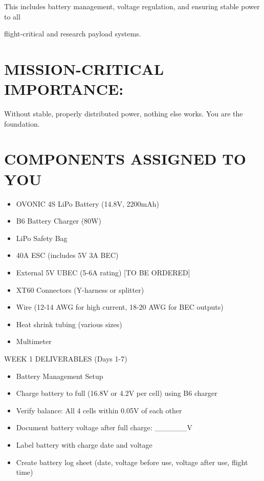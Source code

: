 \documentclass[11pt,letterpaper]{article}
\begin{document}
This includes battery management, voltage regulation, and ensuring stable power to all\par

flight-critical and research payload systems.\par

\section{MISSION-CRITICAL IMPORTANCE:}

Without stable, properly distributed power, nothing else works. You are the foundation.\par

\section{COMPONENTS ASSIGNED TO YOU}

\begin{itemize}
  \item OVONIC 4S LiPo Battery (14.8V, 2200mAh)
  \item B6 Battery Charger (80W)
  \item LiPo Safety Bag
  \item 40A ESC (includes 5V 3A BEC)
  \item External 5V UBEC (5-6A rating) [TO BE ORDERED]
  \item XT60 Connectors (Y-harness or splitter)
  \item Wire (12-14 AWG for high current, 18-20 AWG for BEC outputs)
  \item Heat shrink tubing (various sizes)
  \item Multimeter
\end{itemize}

WEEK 1 DELIVERABLES (Days 1-7)\par

\begin{itemize}
  \item Battery Management Setup
  \item Charge battery to full (16.8V or 4.2V per cell) using B6 charger
  \item Verify balance: All 4 cells within 0.05V of each other
  \item Document battery voltage after full charge: \_\_\_\_\_\_V
  \item Label battery with charge date and voltage
  \item Create battery log sheet (date, voltage before use, voltage after use, flight time)
\end{itemize}
\end{document}
